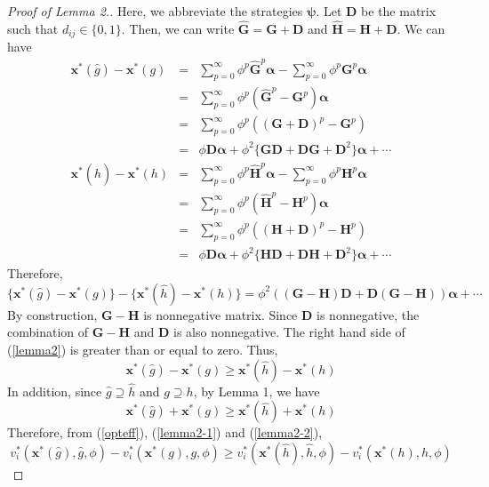 \documentclass[12pt]{article}
\theoremstyle{definition}
\begin{document}
\begin{proof}[Proof of Lemma 2.]
	Here, we abbreviate the strategies $\bm{\psi}$.
	Let $\bm{D}$ be the matrix such that $d_{ij} \in \{0,1\}$.
	Then, we can write $\bm{\hat{G}} = \bm{G} + \bm{D}$ and $\bm{\hat{H}} = \bm{H} + \bm{D}$.
	We can have
	\begin{eqnarray*}
		\bm{x}^*(\hat{g}) - \bm{x}^*(g)
			&=& \sum_{p=0}^{\infty} \phi^p \bm{\hat{G}}^p \bm{\alpha} - \sum_{p=0}^{\infty} \phi^p \bm{G}^p \bm{\alpha} \\
			&=& \sum_{p=0}^{\infty} \phi^p (\bm{\hat{G}}^p - \bm{G}^p) \bm{\alpha} \\
			&=& \sum_{p=0}^{\infty} \phi^p ({(\bm{G} + \bm{D})}^p - \bm{G}^p) \\
			&=& \phi \bm{D} \bm{\alpha} + \phi^2 \{ \bm{G} \bm{D} + \bm{D} \bm{G} + \bm{D}^2 \} \bm{\alpha} + \cdots \\
		\bm{x}^*(\hat{h}) - \bm{x}^*(h)
			&=& \sum_{p=0}^{\infty} \phi^p \bm{\hat{H}}^p \bm{\alpha} - \sum_{p=0}^{\infty} \phi^p \bm{H}^p \bm{\alpha} \\
			&=& \sum_{p=0}^{\infty} \phi^p (\bm{\hat{H}}^p - \bm{H}^p) \bm{\alpha} \\
			&=& \sum_{p=0}^{\infty} \phi^p ({(\bm{H} + \bm{D})}^p - \bm{H}^p) \\
			&=& \phi \bm{D} \bm{\alpha} + \phi^2 \{ \bm{H} \bm{D} + \bm{D} \bm{H} + \bm{D}^2 \} \bm{\alpha} + \cdots
	\end{eqnarray*}
	Therefore,
	\begin{equation}
		\label{lemma2}
		\{ \bm{x}^*(\hat{g}) - \bm{x}^*(g) \} - \{ \bm{x}^*(\hat{h}) - \bm{x}^*(h) \} = \phi^2 ((\bm{G} - \bm{H}) \bm{D} + \bm{D} (\bm{G} - \bm{H})) \bm{\alpha} + \cdots
	\end{equation}
	By construction, $\bm{G} - \bm{H}$ is nonnegative matrix.
	Since $\bm{D}$ is nonnegative, the combination of $\bm{G} - \bm{H}$ and $\bm{D}$ is also nonnegative.
	The right hand side of (\ref{lemma2}) is greater than or equal to zero.
	Thus,
	\begin{equation}
		\label{lemma2-1}
		\bm{x}^*(\hat{g}) - \bm{x}^*(g) \ge \bm{x}^*(\hat{h}) - \bm{x}^*(h)
	\end{equation}
	In addition, since $\hat{g} \supseteq \hat{h}$ and $g \supseteq h$, by Lemma 1, we have
	\begin{equation}
		\label{lemma2-2}
		\bm{x}^*(\hat{g}) + \bm{x}^*(g) \ge \bm{x}^*(\hat{h}) + \bm{x}^*(h)
	\end{equation}
	Therefore, from (\ref{opteff}), (\ref{lemma2-1}) and (\ref{lemma2-2}),
	\[ v_i^*(\bm{x}^*(\hat{g}), \hat{g}, \phi) - v_i^*(\bm{x}^*(g), g, \phi) \ge v_i^*(\bm{x}^*(\hat{h}), \hat{h}, \phi) - v_i^*(\bm{x}^*(h), h, \phi)\]
\end{proof}
\end{document}
